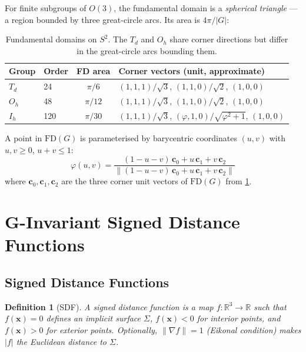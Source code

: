 \documentclass[11pt, a4paper]{article}
\newtheorem{definition}{Definition}[section]
\newcommand{\R}{\mathbb{R}}
\newcommand{\FD}{\mathrm{FD}}
\newcommand{\card}[1]{\lvert #1 \rvert}
\newcommand{\norm}[1]{\lVert #1 \rVert}
\newcommand{\Td}{T_d}
\newcommand{\Oh}{O_h}
\newcommand{\Ih}{I_h}
\begin{document}
For finite subgroups of $O(3)$, the fundamental domain is a \emph{spherical
triangle} — a region bounded by three great-circle arcs. Its area is
$4\pi / \card{G}$:

\begin{table}[h]
\centering
\begin{tabular}{llcl}
\toprule
Group & Order & FD area & Corner vectors (unit, approximate) \\
\midrule
$\Td$ & 24  & $\pi/6$  & $(1,1,1)/\sqrt{3}$,\; $(1,1,0)/\sqrt{2}$,\; $(1,0,0)$ \\
$\Oh$ & 48  & $\pi/12$ & $(1,1,1)/\sqrt{3}$,\; $(1,1,0)/\sqrt{2}$,\; $(1,0,0)$ \\
$\Ih$ & 120 & $\pi/30$ & $(1,1,1)/\sqrt{3}$,\; $(\varphi,1,0)/\sqrt{\varphi^2+1}$,\; $(1,0,0)$ \\
\bottomrule
\end{tabular}
\caption{Fundamental domains on $S^2$. The $\Td$ and $\Oh$ share corner directions
but differ in the great-circle arcs bounding them.}
\label{tab:fd}
\end{table}

A point in $\FD(G)$ is parameterised by barycentric coordinates $(u,v)$ with
$u,v \geq 0$, $u+v \leq 1$:
\begin{equation}
  \varphi(u,v) = \frac{(1-u-v)\,\mathbf{c}_0 + u\,\mathbf{c}_1 + v\,\mathbf{c}_2}
                      {\norm{(1-u-v)\,\mathbf{c}_0 + u\,\mathbf{c}_1 + v\,\mathbf{c}_2}}
  \label{eq:fdpoint}
\end{equation}
where $\mathbf{c}_0, \mathbf{c}_1, \mathbf{c}_2$ are the three corner unit vectors of
$\FD(G)$ from \cref{tab:fd}.

\section{G-Invariant Signed Distance Functions}
\label{sec:sdf}

\subsection{Signed Distance Functions}

\begin{definition}[SDF]
A \emph{signed distance function} is a map $f: \R^3 \to \R$ such that
$f(\mathbf{x}) = 0$ defines an implicit surface $\Sigma$, $f(\mathbf{x}) < 0$
for interior points, and $f(\mathbf{x}) > 0$ for exterior points.
Optionally, $\norm{\nabla f} = 1$ (Eikonal condition) makes $|f|$ the
Euclidean distance to $\Sigma$.
\end{definition}
\end{document}
